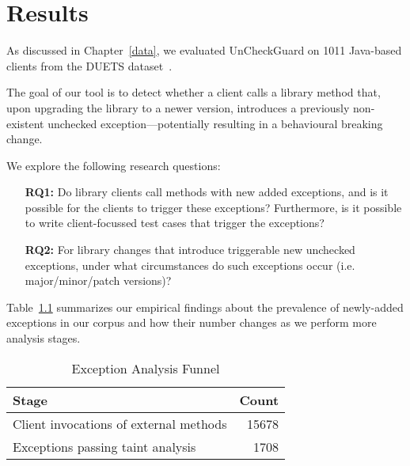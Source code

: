 \chapter{Results}
As discussed in Chapter~\ref{data}, we evaluated UnCheckGuard on 1011 Java-based clients from the DUETS dataset~\cite{durieux21:_duets}.

The goal of our tool is to detect whether a client calls a library method that, upon upgrading the library to a newer version, introduces a previously non-existent unchecked exception—potentially resulting in a behavioural breaking change.

We explore the following research questions:

\begin{itemize}
  \item[\textbf{RQ1:}] Do library clients call methods with new added exceptions, and is it possible for the clients to trigger these exceptions? Furthermore, is it possible to write client-focussed test cases that trigger the exceptions?
  \item[\textbf{RQ2:}] For library changes that introduce triggerable new unchecked exceptions, under what circumstances do such exceptions occur (i.e. major/minor/patch versions)?
\end{itemize}

Table~\ref{tab:exception-funnel} summarizes our empirical findings about the prevalence of newly-added exceptions in our corpus and how their number changes as we perform more analysis stages.

\begin{table}[h]
\centering
\caption{Exception Analysis Funnel}
\label{tab:exception-funnel}
\begin{tabular}{l r}
\toprule
\textbf{Stage} & \textbf{Count} \\
\midrule
Client invocations of external methods & 15678 \\
Exceptions passing taint analysis & 1708 \\
\bottomrule
\end{tabular}
\end{table}


